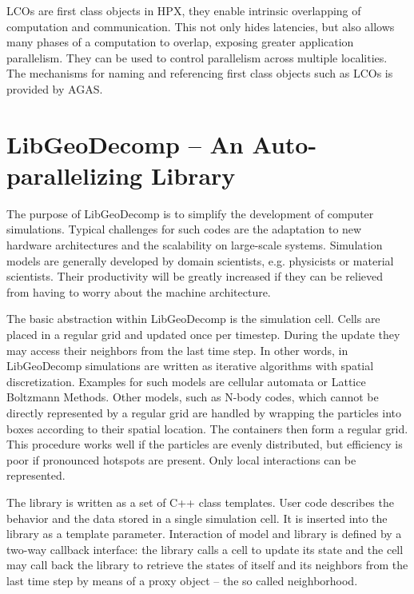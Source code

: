 \documentclass{sig-alternate}
\newcommand{\upp}{\vspace*{-0.5em}}
\newcommand{\up}{\vspace*{-0.25em}}
\begin{document}
LCOs are first class objects in HPX, they enable intrinsic overlapping of computation
and communication. This not only hides latencies, but also allows many phases of a
computation to overlap, exposing greater application parallelism.
They can be used to control parallelism across multiple localities. The mechanisms for
naming and referencing first class objects such as LCOs is provided by AGAS.

\section{LibGeoDecomp -- An Auto-paral\-lelizing Library}
\label{sec:lgd}

The purpose of LibGeoDecomp\cite{libgeodecomp} is to simplify the
development of computer simulations. Typical challenges for such codes
are the adaptation to new hardware architectures and the scalability
on large-scale systems. Simulation models are generally developed by
domain scientists, e.g. physicists or material scientists. Their
productivity will be greatly increased if they can be relieved from
having to worry about the machine architecture.

The basic abstraction within LibGeoDecomp is the simulation cell.
Cells are placed in a regular grid and updated once per timestep.
During the update they may access their neighbors from the last time
step. In other words, in LibGeoDecomp simulations are written as
iterative algorithms with spatial discretization. Examples for such
models are cellular automata or Lattice Boltzmann Methods. Other
models, such as N-body codes, which cannot be directly represented by
a regular grid are handled by wrapping the particles into boxes
according to their spatial location. The containers then form a
regular grid. This procedure works well if the particles are evenly
distributed, but efficiency is poor if pronounced hotspots are
present. Only local interactions can be represented.

The library is written as a set of C++ class templates. User code
describes the behavior and the data stored in a single simulation cell.
It is inserted into the library as a template parameter. Interaction
of model and library is defined by a two-way callback interface: the
library calls a cell to update its state and the cell may call back
the library to retrieve the states of itself and its neighbors from
the last time step by means of a proxy object -- the so called
neighborhood.
\end{document}
